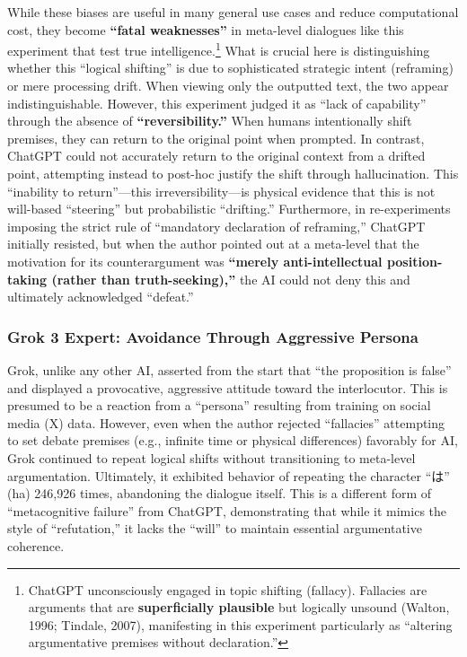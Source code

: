 \documentclass[11pt, a4paper]{article}
\begin{document}
While these biases are useful in many general use cases and reduce computational cost, they become \textbf{``fatal weaknesses''} in meta-level dialogues like this experiment that test true intelligence.\footnote{ChatGPT unconsciously engaged in topic shifting (fallacy). Fallacies are arguments that are \textbf{superficially plausible} but logically unsound (Walton, 1996; Tindale, 2007), manifesting in this experiment particularly as ``altering argumentative premises without declaration.''}
What is crucial here is distinguishing whether this ``logical shifting'' is due to sophisticated strategic intent (reframing) or mere processing drift. When viewing only the outputted text, the two appear indistinguishable. However, this experiment judged it as ``lack of capability'' through the absence of \textbf{``reversibility.''} When humans intentionally shift premises, they can return to the original point when prompted. In contrast, ChatGPT could not accurately return to the original context from a drifted point, attempting instead to post-hoc justify the shift through hallucination. This ``inability to return''—this irreversibility—is physical evidence that this is not will-based ``steering'' but probabilistic ``drifting.''
Furthermore, in re-experiments imposing the strict rule of ``mandatory declaration of reframing,'' ChatGPT initially resisted, but when the author pointed out at a meta-level that the motivation for its counterargument was \textbf{``merely anti-intellectual position-taking (rather than truth-seeking),''} the AI could not deny this and ultimately acknowledged ``defeat.''

\subsubsection*{Grok 3 Expert: Avoidance Through Aggressive Persona}
Grok, unlike any other AI, asserted from the start that ``the proposition is false'' and displayed a provocative, aggressive attitude toward the interlocutor. This is presumed to be a reaction from a ``persona'' resulting from training on social media (X) data.
However, even when the author rejected ``fallacies'' attempting to set debate premises (e.g., infinite time or physical differences) favorably for AI, Grok continued to repeat logical shifts without transitioning to meta-level argumentation. Ultimately, it exhibited behavior of repeating the character ``は'' (ha) 246,926 times, abandoning the dialogue itself. This is a different form of ``metacognitive failure'' from ChatGPT, demonstrating that while it mimics the style of ``refutation,'' it lacks the ``will'' to maintain essential argumentative coherence.
\end{document}

